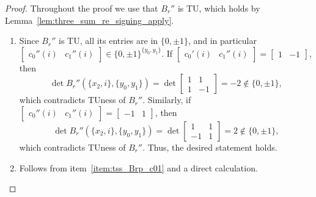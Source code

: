 \begin{proof}
    Throughout the proof we use that $B_{r}''$ is TU, which holds by Lemma~\ref{lem:three_sum_re_signing_apply}.

    \begin{enumerate}
        \item Since $B_{r}''$ is TU, all its entries are in $\{0, \pm 1\}$, and in particular $\begin{bmatrix} c_{0}'' (i) & c_{1}'' (i) \end{bmatrix} \in \{0, \pm 1\}^{\{y_{0}, y_{1}\}}$. If $\begin{bmatrix} c_{0}' (i) & c_{1}'' (i) \end{bmatrix} = \begin{bmatrix} 1 & -1 \end{bmatrix}$, then
        \[
            \det B_{r}'' (\{x_{2}, i\}, \{y_{0}, y_{1}\}) = \det \begin{bmatrix} 1 & 1 \\ 1 & -1 \end{bmatrix} = -2 \notin \{0, \pm 1\},
        \]
        which contradicts TUness of $B_{r}''$. Similarly, if $\begin{bmatrix} c_{0}'' (i) & c_{1}'' (i) \end{bmatrix} = \begin{bmatrix} -1 & 1 \end{bmatrix} $, then
        \[
            \det B_{r}'' (\{x_{2}, i\}, \{y_{0}, y_{1}\}) = \det \begin{bmatrix} 1 & 1 \\ -1 & 1 \end{bmatrix} = 2 \notin \{0, \pm 1\},
        \]
        which contradicts TUness of $B_{r}''$. Thus, the desired statement holds.

        \item Follows from item~\ref{item:tss_Brp_c01} and a direct calculation.


\end{enumerate}
\end{proof}
